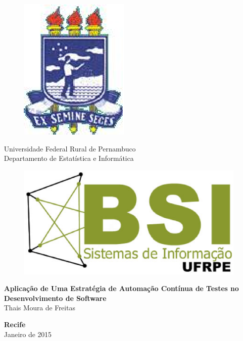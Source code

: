 \begin{figure}[h]
\leavevmode
\begin{minipage}{\textwidth}
\includegraphics[scale=0.7]
{prefacios/capa/logo-ufrpe.eps}
\end{minipage}
\end{figure}
\vspace{-3.5cm}
{\bf
\begin{center}
{\Large
\hspace*{0cm}Universidade Federal Rural de Pernambuco \\
\hspace*{0cm}Departamento de Estatística e Informática}\\
\end{center}
}
\noindent
\begin{figure}[h]
\centering
\includegraphics[scale=0.5]{prefacios/capa/logo-bsi-presencial-v3-amp.eps}
\end{figure}


\vspace{2.5cm}
\noindent
\begin{center}
{\Large \bf Aplicação de Uma Estratégia de Automação Contínua de Testes no Desenvolvimento de Software} \\[5cm]
{\Large Thais Moura de Freitas}\\[6mm]
\end{center}


\vspace{1.5cm}
\begin{center}
{\large {\bf Recife}\\[6mm]
Janeiro de 2015}
\end{center}
\newpage
